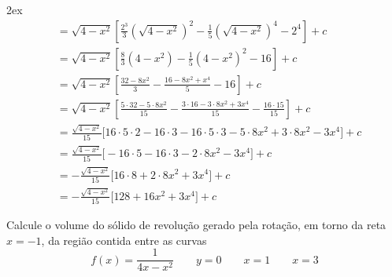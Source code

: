 \documentclass[a4paper,12pt,fleqn]{article}
\begin{document}
\begin{answer}
\begin{spreadlines}{2ex}
\begin{align*}
      & = \sqrt{4-x^2}
      \left[
      \frac{2^3}{3}\left(\sqrt{4-x^2}\right)^2
      - \frac{1}  {5}\left(\sqrt{4-x^2}\right)^4
      - 2^4
      \right] + c \\
      & = \sqrt{4-x^2}
      \left[
      \frac{8}{3}\left(4-x^2\right)
      - \frac{1}{5}\left(4-x^2\right)^2
      - 16
      \right] + c \\
      & = \sqrt{4-x^2}
      \left[
      \frac{32-8x^2}{3}
      - \frac{16-8x^2+x^4}{5}
      - 16
      \right] + c \\
      & = \sqrt{4-x^2}
      \left[
      \frac{5\cdot 32 - 5\cdot 8x^2}{15}
      -\frac{3\cdot 16 - 3\cdot 8x^2 + 3x^4}{15} - \frac{16\cdot 15}{15}
      \right] + c \\
      & = \frac{\sqrt{4-x^2}}{15}
      \Big[
      16\cdot 5\cdot 2 - 16 \cdot 3 - 16\cdot 5 \cdot 3
      - 5\cdot 8x^2 + 3\cdot 8x^2
      - 3x^4
      \Big] + c \\
      & = \frac{\sqrt{4-x^2}}{15}
      \Big[
      - 16\cdot 5 -16 \cdot 3
      - 2\cdot 8x^2
      - 3x^4
      \Big] + c \\
      & = -\frac{\sqrt{4-x^2}}{15}
      \Big[
      16\cdot 8
      + 2\cdot 8x^2
      + 3x^4
      \Big] + c \\
      & = -\frac{\sqrt{4-x^2}}{15}
      \Big[ 128 + 16x^2 + 3x^4 \Big] + c
    \end{align*}
  \end{spreadlines}
\end{answer}

Calcule o volume do sólido de revolução gerado pela rotação,
em torno da reta \(x=-1\), da região contida entre as curvas
\[
  f(x) = \frac{1}{4x-x^2} \qquad
  y = 0 \qquad
  x = 1 \qquad
  x = 3
\]
\end{document}
